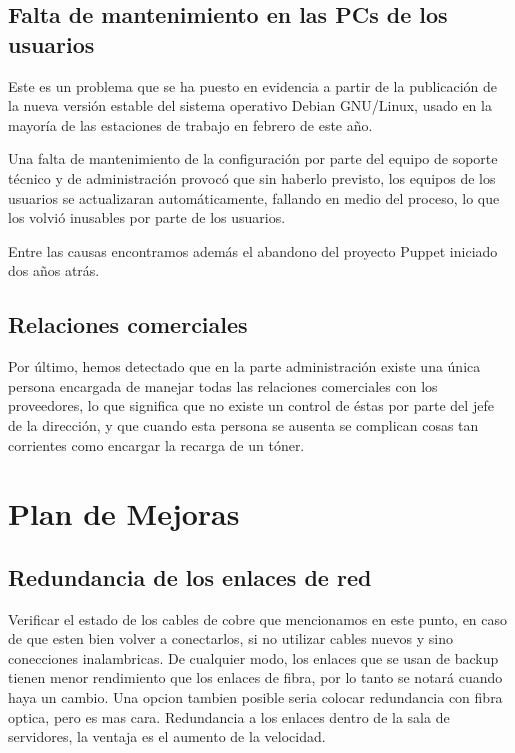 \documentclass[a4paper,11pt,oneside]{article}
\begin{document}
\subsection*{Falta de mantenimiento en las PCs de los usuarios}
Este es un problema que se ha puesto en evidencia a partir de la
publicación de la nueva versión estable del sistema operativo Debian
GNU/Linux, usado en la mayoría de las estaciones de trabajo en febrero
de este año.

Una falta de mantenimiento de la configuración por parte del equipo de
soporte técnico y de administración provocó que sin haberlo previsto,
los equipos de los usuarios se actualizaran automáticamente, fallando
en medio del proceso, lo que los volvió inusables por parte de los
usuarios.

Entre las causas encontramos además el abandono del proyecto Puppet
iniciado dos años atrás.
%
%
\subsection*{Relaciones comerciales}
Por último, hemos detectado que en la parte administración existe una
única persona encargada de manejar todas las relaciones comerciales
con los proveedores, lo que significa que no existe un control de
éstas por parte del jefe de la dirección, y que cuando esta persona se
ausenta se complican cosas tan corrientes como encargar la recarga de
un tóner.
\newpage
\section{Plan de Mejoras}
\subsection*{Redundancia de los enlaces de red}
Verificar el estado de los cables de cobre que mencionamos en este punto, en caso de que esten bien volver a conectarlos, si no utilizar cables nuevos y sino conecciones inalambricas.
De cualquier modo, los enlaces que se usan de backup tienen menor rendimiento que los enlaces de fibra, por lo tanto se notará cuando haya un cambio. Una opcion tambien posible seria colocar redundancia con fibra optica, pero es mas cara.
Redundancia a los enlaces dentro de la sala de servidores, la ventaja es el aumento de la velocidad.
\end{document}

